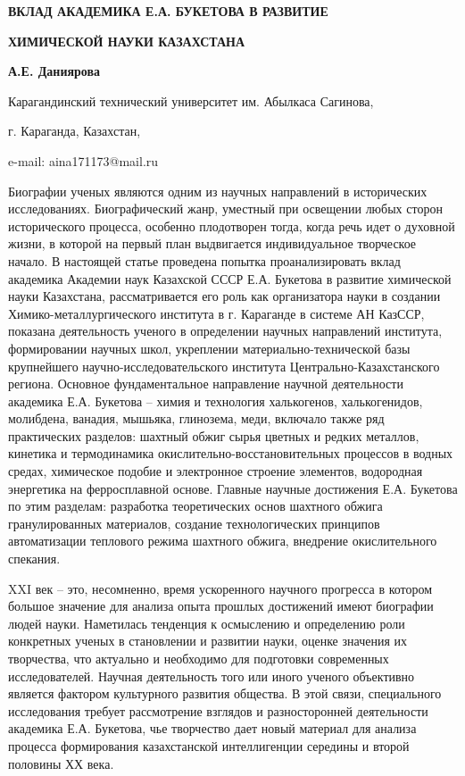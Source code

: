 {\bfseries ВКЛАД АКАДЕМИКА Е.А. БУКЕТОВА В РАЗВИТИЕ}

{\bfseries ХИМИЧЕСКОЙ НАУКИ КАЗАХСТАНА}

{\bfseries А.Е. Даниярова}

Карагандинский технический университет им. Абылкаса Сагинова,

г. Караганда, Казахстан,

e-mail: aina171173@mail.ru

Биографии ученых являются одним из научных направлений в исторических
исследованиях. Биографический жанр, уместный при освещении любых сторон
исторического процесса, особенно плодотворен тогда, когда речь идет о
духовной жизни, в которой на первый план выдвигается индивидуальное
творческое начало. В настоящей статье проведена попытка проанализировать
вклад академика Академии наук Казахской СССР Е.А. Букетова в развитие
химической науки Казахстана, рассматривается его роль как организатора
науки в создании Химико-металлургического института в г. Караганде в
системе АН КазССР, показана деятельность ученого в определении научных
направлений института, формировании научных школ, укреплении
материально-технической базы крупнейшего научно-исследовательского
института Центрально-Казахстанского региона. Основное фундаментальное
направление научной деятельности академика Е.А. Букетова -- химия и
технология халькогенов, халькогенидов, молибдена, ванадия, мышьяка,
глинозема, меди, включало также ряд практических разделов: шахтный обжиг
сырья цветных и редких металлов, кинетика и термодинамика
окислительно-восстановительных процессов в водных средах, химическое
подобие и электронное строение элементов, водородная энергетика на
ферросплавной основе. Главные научные достижения Е.А. Букетова по этим
разделам: разработка теоретических основ шахтного обжига гранулированных
материалов, создание технологических принципов автоматизации теплового
режима шахтного обжига, внедрение окислительного спекания.

XXI век -- это, несомненно, время ускоренного научного прогресса в
котором большое значение для анализа опыта прошлых достижений имеют
биографии людей науки. Наметилась тенденция к осмыслению и определению
роли конкретных ученых в становлении и развитии науки, оценке значения
их творчества, что актуально и необходимо для подготовки современных
исследователей. Научная деятельность того или иного ученого объективно
является фактором культурного развития общества. В этой связи,
специального исследования требует рассмотрение взглядов и разносторонней
деятельности академика Е.А. Букетова, чье творчество дает новый материал
для анализа процесса формирования казахстанской интеллигенции середины и
второй половины ХХ века.

